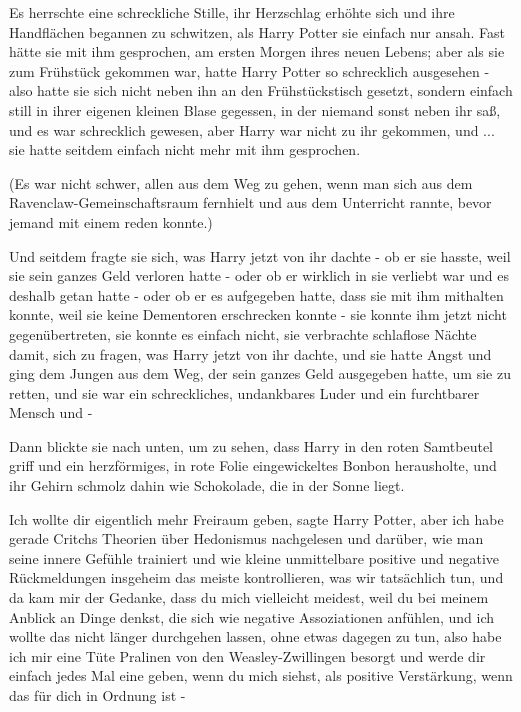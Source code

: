 Es herrschte eine schreckliche Stille, ihr Herzschlag erhöhte sich und ihre
Handflächen begannen zu schwitzen, als Harry Potter sie einfach nur ansah. Fast
hätte sie mit ihm gesprochen, am ersten Morgen ihres neuen Lebens; aber als sie
zum Frühstück gekommen war, hatte Harry Potter so schrecklich ausgesehen - also
hatte sie sich nicht neben ihn an den Frühstückstisch gesetzt, sondern einfach
still in ihrer eigenen kleinen Blase gegessen, in der niemand sonst neben ihr
saß, und es war schrecklich gewesen, aber Harry war nicht zu ihr gekommen, und
... sie hatte seitdem einfach nicht mehr mit ihm gesprochen.

(Es war nicht schwer, allen aus dem Weg zu gehen, wenn man sich aus dem
Ravenclaw-Gemeinschaftsraum fernhielt und aus dem Unterricht rannte, bevor
jemand mit einem reden konnte.)

Und seitdem fragte sie sich, was Harry jetzt von ihr dachte - ob er sie hasste,
weil sie sein ganzes Geld verloren hatte - oder ob er wirklich in sie verliebt
war und es deshalb getan hatte - oder ob er es aufgegeben hatte, dass sie mit
ihm mithalten konnte, weil sie keine Dementoren erschrecken konnte - sie konnte
ihm jetzt nicht gegenübertreten, sie konnte es einfach nicht, sie verbrachte
schlaflose Nächte damit, sich zu fragen, was Harry jetzt von ihr dachte, und sie
hatte Angst und ging dem Jungen aus dem Weg, der sein ganzes Geld ausgegeben
hatte, um sie zu retten, und sie war ein schreckliches, undankbares Luder und
ein furchtbarer Mensch und -

Dann blickte sie nach unten, um zu sehen, dass Harry in den roten Samtbeutel
griff und ein herzförmiges, in rote Folie eingewickeltes Bonbon herausholte, und
ihr Gehirn schmolz dahin wie Schokolade, die in der Sonne liegt.

\glqq{}Ich wollte dir eigentlich mehr Freiraum geben\grqq{}, sagte Harry Potter,
\glqq{}aber ich habe gerade Critchs Theorien über Hedonismus nachgelesen und
darüber, wie man seine innere Gefühle trainiert und wie kleine unmittelbare
positive und negative Rückmeldungen insgeheim das meiste kontrollieren, was wir
tatsächlich tun, und da kam mir der Gedanke, dass du mich vielleicht meidest,
weil du bei meinem Anblick an Dinge denkst, die sich wie negative Assoziationen
anfühlen, und ich wollte das nicht länger durchgehen lassen, ohne etwas dagegen
zu tun, also habe ich mir eine Tüte Pralinen von den Weasley-Zwillingen besorgt
und werde dir einfach jedes Mal eine geben, wenn du mich siehst, als positive
Verstärkung, wenn das für dich in Ordnung ist -\grqq{}


